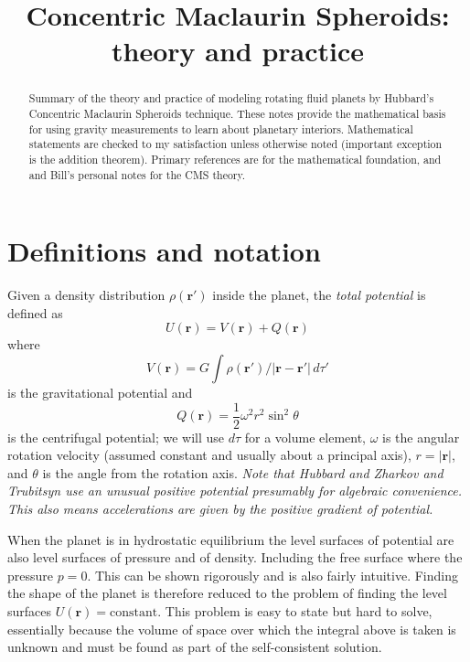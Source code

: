 \documentclass[amsmath,amsfonts,rmp,letterpaper]{revtex4}
\newcommand{\V}[1]{\mathbf{#1}} %
\newcommand{\abs}[1]{\left\vert#1\right\vert} %
\newcommand{\arr}{\V{r}}
\newcommand{\arp}{\V{r'}}
\begin{document}
\title{Concentric Maclaurin Spheroids: theory and practice}%
\author{}
\begin{abstract}
Summary of the theory and practice of modeling rotating fluid planets by Hubbard's
Concentric Maclaurin Spheroids technique. These notes provide the mathematical
basis for using gravity measurements to learn about planetary interiors.
Mathematical statements are checked to my satisfaction unless otherwise noted
(important exception is the addition theorem). Primary references are
\citep{Zharkov1978} for the mathematical foundation, and \citep{Hubbard2013} and
Bill's personal notes for the CMS theory.
\end{abstract}
\maketitle
\tableofcontents

\section{Definitions and notation}\label{sec:definitions}
Given a density distribution $\rho(\arp)$ inside the planet, the \emph{total
potential} is defined as
\begin{equation}
U(\arr) = V(\arr) + Q(\arr)
\end{equation}
where
\begin{equation}\label{eq:gravpot}
V(\arr) = G\int{\rho(\arp)/\abs{\arr - \arp}\,d\tau'}
\end{equation}
is the gravitational potential and
\begin{equation}\label{eq:cetrifugal_potential}
Q(\arr) = \frac{1}{2}\omega^2r^2\sin^2\theta
\end{equation}
is the centrifugal potential; we will use $d\tau$ for a volume element, $\omega$
is the angular rotation velocity (assumed constant and usually about a principal
axis), $r=\abs{\arr}$, and $\theta$ is the angle from the rotation axis.
\emph{Note that Hubbard and Zharkov and Trubitsyn use an unusual positive
potential presumably for algebraic convenience. This also means accelerations are
given by the positive gradient of potential.}

When the planet is in hydrostatic equilibrium the level surfaces of potential are
also level surfaces of pressure and of density. Including the free surface where
the pressure $p=0$. This can be shown rigorously \citep[e.g.][]{Batchelor1967} and
is also fairly intuitive. Finding the shape of the planet is therefore reduced to
the problem of finding the level surfaces $U(\arr)=\text{constant}$. This problem
is easy to state but hard to solve, essentially because the volume of space over
which the integral above is taken is unknown and must be found as part of the
self-consistent solution.
\end{document}
